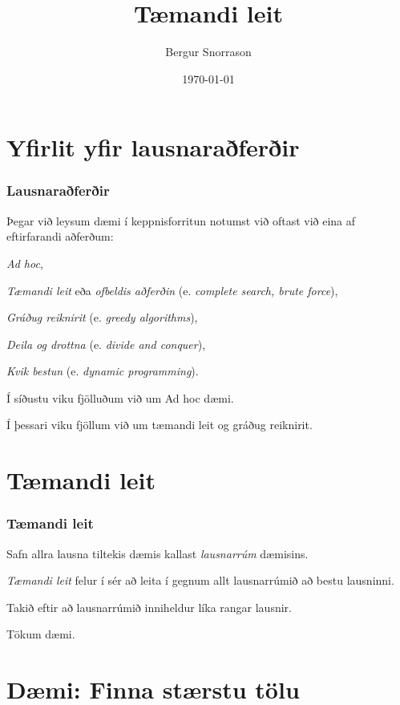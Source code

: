 \title{Tæmandi leit}
\author{Bergur Snorrason}
\date{\today}



\frame{\titlepage}

\section{Yfirlit yfir lausnaraðferðir}
{
    \frametitle{Lausnaraðferðir}
    {
        \item<1-> Þegar við leysum dæmi í keppnisforritun notumst við oftast við eina af eftirfarandi aðferðum:
        {
            \item<2-> \emph{Ad hoc},
            \item<3-> \emph{Tæmandi leit} eða \emph{ofbeldis aðferðin} (e. \emph{complete search, brute force}),
            \item<4-> \emph{Gráðug reiknirit} (e. \emph{greedy algorithms}),
            \item<5-> \emph{Deila og drottna} (e. \emph{divide and conquer}),
            \item<6-> \emph{Kvik bestun} (e. \emph{dynamic programming}).
        }
        \item<7-> Í síðustu viku fjölluðum við um Ad hoc dæmi.
        \item<8-> Í þessari viku fjöllum við um tæmandi leit og gráðug reiknirit.
    }
}

\section{Tæmandi leit}
{
    \frametitle{Tæmandi leit}
    {
        \item<1-> Safn allra lausna tiltekis dæmis kallast \emph{lausnarrúm} dæmisins.
        \item<2-> \emph{Tæmandi leit} felur í sér að leita í gegnum allt lausnarrúmið að bestu lausninni.
        \item<3-> Takið eftir að lausnarrúmið inniheldur líka rangar lausnir.
        \item<4-> Tökum dæmi.
    }
}

\section{Dæmi: Finna stærstu tölu}
